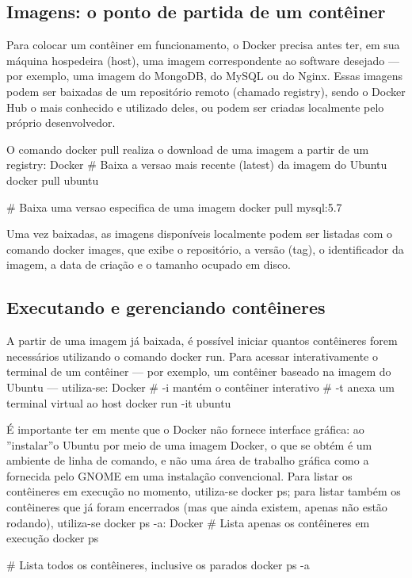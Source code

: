 \subsection{Imagens: o ponto de partida de um contêiner}

Para colocar um contêiner em funcionamento, o Docker precisa antes ter, em sua máquina hospedeira (host), uma imagem correspondente ao software desejado — por exemplo, uma imagem do MongoDB, do MySQL ou do Nginx. Essas imagens podem ser baixadas de um repositório remoto (chamado registry), sendo o Docker Hub o mais conhecido e utilizado deles, ou podem ser criadas localmente pelo próprio desenvolvedor.

O comando docker pull realiza o download de uma imagem a partir de um registry: Docker \# Baixa a versao mais recente (latest) da imagem do Ubuntu docker pull ubuntu

\# Baixa uma versao especifica de uma imagem docker pull mysql:5.7

Uma vez baixadas, as imagens disponíveis localmente podem ser listadas com o comando docker images, que exibe o repositório, a versão (tag), o identificador da imagem, a data de criação e o tamanho ocupado em disco.

\subsection{Executando e gerenciando contêineres}

A partir de uma imagem já baixada, é possível iniciar quantos contêineres forem necessários utilizando o comando docker run. Para acessar interativamente o terminal de um contêiner — por exemplo, um contêiner baseado na imagem do Ubuntu — utiliza-se: Docker \# -i mantém o contêiner interativo \# -t anexa um terminal virtual ao host docker run -it ubuntu

É importante ter em mente que o Docker não fornece interface gráfica: ao ”instalar”o Ubuntu por meio de uma imagem Docker, o que se obtém é um ambiente de linha de comando, e não uma área de trabalho gráfica como a fornecida pelo GNOME em uma instalação convencional. Para listar os contêineres em execução no momento, utiliza-se docker ps; para listar também os contêineres que já foram encerrados (mas que ainda existem, apenas não estão rodando), utiliza-se docker ps -a: Docker \# Lista apenas os contêineres em execução docker ps

\# Lista todos os contêineres, inclusive os parados docker ps -a

